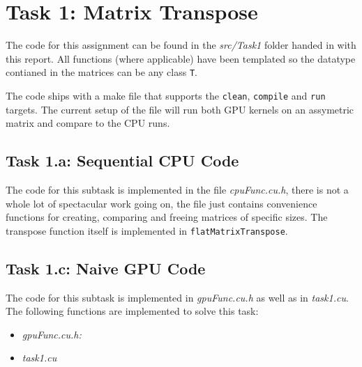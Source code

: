 \section{Task 1: Matrix Transpose}
The code for this assignment can be found in the \textit{src/Task1} folder
handed in with this report. All functions (where applicable) have been templated
so the datatype contianed in the matrices can be any class \texttt{T}.

The code ships with a make file that supports the \texttt{clean},
\texttt{compile} and \texttt{run} targets. The current setup of the file will
run both GPU kernels on an assymetric matrix and compare to the CPU runs.

\subsection{Task 1.a: Sequential CPU Code}
The code for this subtask is implemented in the file \textit{cpuFunc.cu.h},
there is not a whole lot of spectacular work going on, the file just contains
convenience functions for creating, comparing and freeing matrices of specific
sizes. The transpose function itself is implemented in
\texttt{flatMatrixTranspose}.

\subsection{Task 1.c: Naive GPU Code}
The code for this subtask is implemented in \textit{gpuFunc.cu.h} as well as
in \textit{task1.cu}. The following functions are implemented to solve this
task:
\begin{itemize}
    \item \textit{gpuFunc.cu.h:}

    \item \textit{task1.cu}
\end{itemize}

